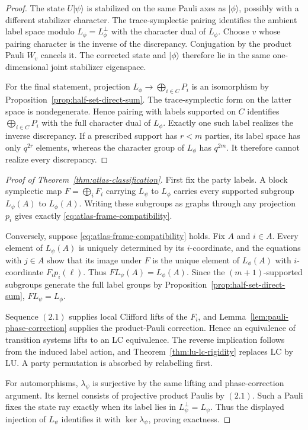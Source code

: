 \begin{proof}
The state \(U\lvert\psi\rangle\) is stabilized on the same Pauli axes as
\(\lvert\phi\rangle\), possibly with a different stabilizer character.
The trace-symplectic pairing identifies the ambient label space modulo
\(L_\phi=L_\phi^\perp\) with the character dual of \(L_\phi\).  Choose
\(v\) whose pairing character is the inverse of the discrepancy.
Conjugation by the product Pauli \(W_v\) cancels it.  The corrected state
and \(\lvert\phi\rangle\) therefore lie in the same one-dimensional joint
stabilizer eigenspace.

For the final statement, projection \(L_\phi\to\bigoplus_{i\in C}P_i\)
is an isomorphism by Proposition~\ref{prop:half-set-direct-sum}.  The
trace-symplectic form on the latter space is nondegenerate.  Hence pairing
with labels supported on \(C\) identifies
\(\bigoplus_{i\in C}P_i\) with the full character dual of \(L_\phi\).
Exactly one such label realizes the inverse discrepancy.
If a prescribed support has \(r<m\) parties, its label space has only
\(q^{2r}\) elements, whereas the character group of \(L_\phi\) has
\(q^{2m}\).  It therefore cannot realize every discrepancy.
\end{proof}

\begin{proof}[Proof of Theorem~\ref{thm:atlas-classification}]
First fix the party labels.  A block symplectic map
\(F=\bigoplus_iF_i\) carrying \(L_\psi\) to \(L_\phi\) carries every
supported subgroup \(L_\psi(A)\) to \(L_\phi(A)\).  Writing these
subgroups as graphs through any projection \(p_i\) gives exactly
\eqref{eq:atlas-frame-compatibility}.

Conversely, suppose \eqref{eq:atlas-frame-compatibility} holds.  Fix \(A\) and \(i\in A\).  Every
element of \(L_\psi(A)\) is uniquely determined by its \(i\)-coordinate,
and the equations with \(j\in A\) show that its image under \(F\) is the
unique element of \(L_\phi(A)\) with \(i\)-coordinate \(F_i p_i(\ell)\).
Thus \(F L_\psi(A)=L_\phi(A)\).  Since the \((m+1)\)-supported subgroups
generate the full label groups by
Proposition~\ref{prop:half-set-direct-sum}, \(F L_\psi=L_\phi\).

Sequence \((2.1)\) supplies local Clifford lifts of the \(F_i\), and
Lemma~\ref{lem:pauli-phase-correction} supplies the product-Pauli
correction.  Hence an equivalence of transition systems lifts to an LC
equivalence.
The reverse implication follows
from the induced label action, and Theorem~\ref{thm:lu-lc-rigidity}
replaces LC by LU.  A party permutation is absorbed by relabelling first.

For automorphisms, \(\lambda_\psi\) is surjective by the same lifting and
phase-correction argument.  Its kernel consists of projective product
Paulis by \((2.1)\).  Such a Pauli fixes the state ray exactly when its
label lies in \(L_\psi^\perp=L_\psi\).  Thus the displayed injection of
\(L_\psi\) identifies it with \(\ker\lambda_\psi\), proving exactness.

\end{proof}

